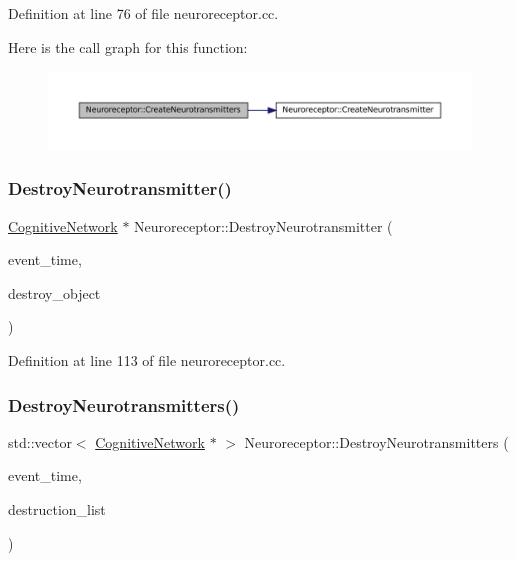 Definition at line 76 of file neuroreceptor.\+cc.

Here is the call graph for this function\+:\nopagebreak
\begin{figure}[H]
\begin{center}
\leavevmode
\includegraphics[width=350pt]{class_neuroreceptor_aa0037379ecb214ff982429e054f2a194_cgraph}
\end{center}
\end{figure}
\mbox{\label{class_neuroreceptor_a35beb8e355f9b567b327e9323f5552a0}} 
\subsubsection{\texorpdfstring{Destroy\+Neurotransmitter()}{DestroyNeurotransmitter()}}
{\footnotesize\ttfamily \mbox{\hyperlink{class_cognitive_network}{Cognitive\+Network}} $\ast$ Neuroreceptor\+::\+Destroy\+Neurotransmitter (\begin{DoxyParamCaption}\item[{std\+::chrono\+::time\+\_\+point$<$ \mbox{\hyperlink{universe_8h_a0ef8d951d1ca5ab3cfaf7ab4c7a6fd80}{Clock}} $>$}]{event\+\_\+time,  }\item[{\mbox{\hyperlink{class_cognitive_network}{Cognitive\+Network}} $\ast$}]{destroy\+\_\+object }\end{DoxyParamCaption})}



Definition at line 113 of file neuroreceptor.\+cc.

\mbox{\label{class_neuroreceptor_acd500abfb25bd08167b2002e85e8b788}} 
\subsubsection{\texorpdfstring{Destroy\+Neurotransmitters()}{DestroyNeurotransmitters()}}
{\footnotesize\ttfamily std\+::vector$<$ \mbox{\hyperlink{class_cognitive_network}{Cognitive\+Network}} $\ast$ $>$ Neuroreceptor\+::\+Destroy\+Neurotransmitters (\begin{DoxyParamCaption}\item[{std\+::chrono\+::time\+\_\+point$<$ \mbox{\hyperlink{universe_8h_a0ef8d951d1ca5ab3cfaf7ab4c7a6fd80}{Clock}} $>$}]{event\+\_\+time,  }\item[{std\+::vector$<$ \mbox{\hyperlink{class_cognitive_network}{Cognitive\+Network}} $\ast$$>$}]{destruction\+\_\+list }\end{DoxyParamCaption})}



